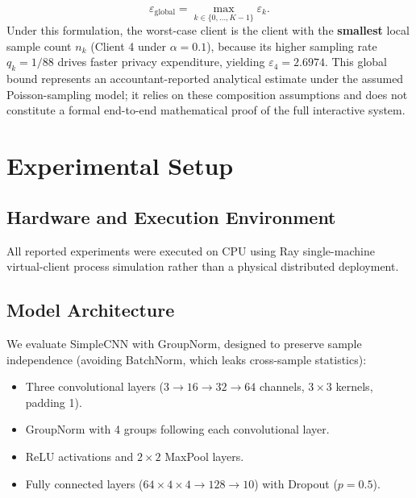 \documentclass[11pt,a4paper]{article}
\begin{document}
\begin{enumerate}
    \begin{equation}
        \varepsilon_{\text{global}} = \max_{k \in \{0, \dots, K-1\}} \varepsilon_k.
    \end{equation}
    Under this formulation, the worst-case client is the client with the \textbf{smallest} local sample count $n_k$ (Client 4 under $\alpha=0.1$), because its higher sampling rate $q_k = 1/88$ drives faster privacy expenditure, yielding $\varepsilon_4 = 2.6974$. This global bound represents an accountant-reported analytical estimate under the assumed Poisson-sampling model; it relies on these composition assumptions and does not constitute a formal end-to-end mathematical proof of the full interactive system.
\end{enumerate}

\section{Experimental Setup}

\subsection{Hardware and Execution Environment}
All reported experiments were executed on CPU using Ray single-machine virtual-client process simulation rather than a physical distributed deployment.

\subsection{Model Architecture}
We evaluate SimpleCNN with GroupNorm, designed to preserve sample independence (avoiding BatchNorm, which leaks cross-sample statistics):
\begin{itemize}
    \item Three convolutional layers ($3 \to 16 \to 32 \to 64$ channels, $3\times 3$ kernels, padding 1).
    \item GroupNorm with 4 groups following each convolutional layer.
    \item ReLU activations and $2\times 2$ MaxPool layers.
    \item Fully connected layers ($64 \times 4 \times 4 \to 128 \to 10$) with Dropout ($p=0.5$).
\end{itemize}
\end{document}
